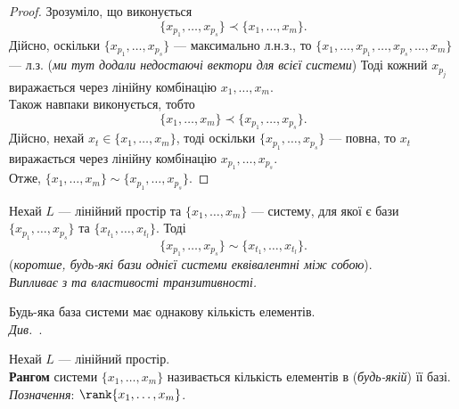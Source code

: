 \documentclass{math_library}
\begin{document}
	\begin{proof}
	Зрозуміло, що виконується 
	\[
	\{x_{p_1}, \dots, x_{p_s} \} \prec \{x_1, \dots, x_m \}.
	\]
	Дійсно, оскільки $\{x_{p_1}, \dots, x_{p_s}\}$ --- максимально л.н.з., то $\{x_1,\dots,x_{p_1},\dots,x_{p_s},\dots,x_m\}$ --- л.з. (\textit{ми тут додали недостаючі вектори для всієї системи}) Тоді кожний $x_{p_j}$ виражається через лінійну комбінацію $x_1,\dots,x_m$.\\
	Також навпаки виконується, тобто
	\[
	\{x_1, \dots, x_m \} \prec \{x_{p_1}, \dots, x_{p_s} \}.
	\]
	Дійсно, нехай $x_t \in \{x_1,\dots,x_m\}$, тоді оскільки $\{x_{p_1}, \dots, x_{p_s}\}$ --- повна, то $x_t$ виражається через лінійну комбінацію $x_{p_1},\dots,x_{p_s}$.\\
	Отже, $\{x_1, \dots, x_m \} \sim \{x_{p_1}, \dots, x_{p_s} \}$.
	\end{proof}
	
	\begin{theorem}
	Нехай $L$ --- лінійний простір та $\{x_1, \dots, x_m\}$ --- систему, для якої є бази $\{x_{p_1}, \dots, x_{p_s}\}$ та $\{x_{t_1}, \dots, x_{t_l}\}$. Тоді
	\[
	\{x_{p_1}, \dots, x_{p_s}\} \sim \{x_{t_1}, \dots, x_{t_l}\}.
	\]
	(\textit{коротше, будь-які бази однієї системи еквівалентні між собою}).\\
	\textit{Випливає з}  \textit{та властивості транзитивності.}
	\end{theorem}
	
	\begin{corollary}
	Будь-яка база системи має однакову кількість елементів.\\
	\textit{Див.\ }.
	\end{corollary}
	
	\begin{definition}
	Нехай $L$ --- лінійний простір.\\
	\textbf{Рангом} системи $\{x_1, \dots, x_m\}$ називається кількість елементів в (\textit{будь-якій}) її базі.\\
	\textit{Позначення}: $\rank\{x_1, \dots, x_m\}$.
	\end{definition}
	
\end{document}
